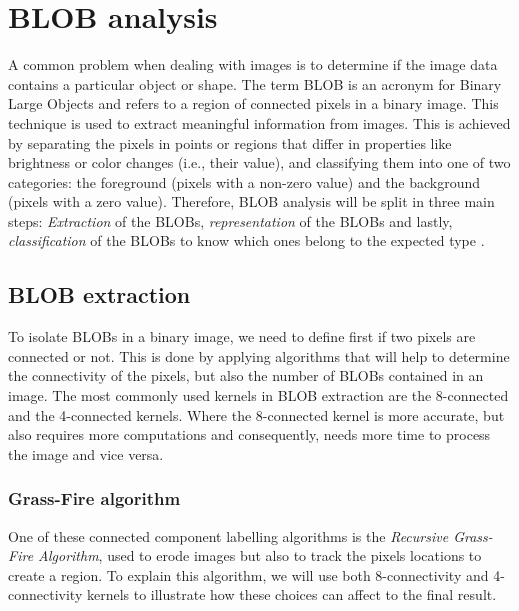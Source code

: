 \section{BLOB analysis}
A common problem when dealing with images is to determine if the image data contains a particular object or shape. The term BLOB is an acronym for Binary Large Objects and refers to a region of connected pixels in a binary image. This technique is used to extract meaningful information from images. This is achieved by separating the pixels in points or regions that differ in properties like brightness or color changes (i.e., their value), and classifying them into one of two categories: the foreground (pixels with a non-zero value) and the background (pixels with a zero value).
Therefore, BLOB analysis will be split in three main steps: \textit{Extraction} of the BLOBs, \textit{representation} of the BLOBs and lastly, \textit{classification} of the BLOBs to know which ones belong to the expected type \citep{ip_book}.

\subsection{BLOB extraction}
To isolate BLOBs in a binary image, we need to define first if two pixels are connected or not. This is done by applying algorithms that will help to determine the connectivity of the pixels, but also the number of BLOBs contained in an image. The most commonly used kernels in BLOB extraction are the 8-connected and the 4-connected kernels. Where the 8-connected kernel is more accurate, but also requires more computations and consequently, needs more time to process the image and vice versa.

\subsubsection{Grass-Fire algorithm}
One of these connected component labelling algorithms is the \textit{Recursive Grass-Fire Algorithm}, used to erode images but also to track the pixels locations to create a region.
To explain this algorithm, we will use both 8-connectivity and 4-connectivity kernels to illustrate how these choices can affect to the final result.


